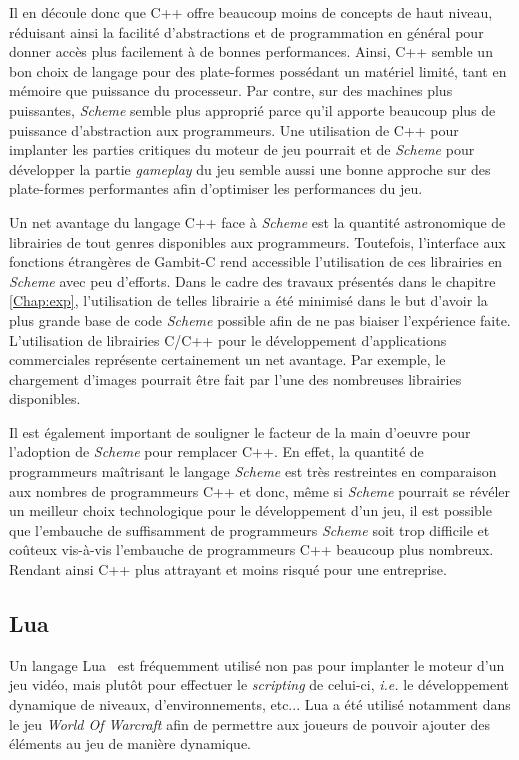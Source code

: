 \documentclass[12pt,twoside,letterpaper,francais]{book}
\newcommand{\ie}{{\textit{i.e. }}}
\newcommand{\Schemelang}{{\textit{Scheme }}}
\begin{document}
Il en découle donc que C++ offre beaucoup moins de concepts de haut
niveau, réduisant ainsi la facilité d'abstractions et de programmation
en général pour donner accès plus facilement à de bonnes
performances. Ainsi, C++ semble un bon choix de langage pour des
plate-formes possédant un matériel limité, tant en mémoire que
puissance du processeur. Par contre, sur des machines plus puissantes,
\Schemelang semble plus approprié parce qu'il apporte beaucoup plus de
puissance d'abstraction aux programmeurs. Une utilisation de C++ pour
implanter les parties critiques du moteur de jeu pourrait et de \Schemelang
pour développer la partie \textit{gameplay} du jeu semble aussi une
bonne approche sur des plate-formes performantes afin d'optimiser les
performances du jeu.

Un net avantage du langage C++ face à \Schemelang est la quantité
astronomique de librairies de tout genres disponibles aux
programmeurs. Toutefois, l'interface aux fonctions étrangères de
Gambit-C rend accessible l'utilisation de ces librairies en \Schemelang
avec peu d'efforts. Dans le cadre des travaux présentés dans le
chapitre \ref{Chap:exp}, l'utilisation de telles librairie a été
minimisé dans le but d'avoir la plus grande base de code \Schemelang
possible afin de ne pas biaiser l'expérience faite. L'utilisation de
librairies C/C++ pour le développement d'applications commerciales
représente certainement un net avantage. Par exemple, le chargement
d'images pourrait être fait par l'une des nombreuses librairies
disponibles.

Il est également important de souligner le facteur de la main d'oeuvre
pour l'adoption de \Schemelang pour remplacer C++. En effet, la quantité de
programmeurs maîtrisant le langage \Schemelang est très restreintes en
comparaison aux nombres de programmeurs C++ et donc, même si \Schemelang
pourrait se révéler un meilleur choix technologique pour le
développement d'un jeu, il est possible que l'embauche de suffisamment
de programmeurs \Schemelang soit trop difficile et coûteux vis-à-vis
l'embauche de programmeurs C++ beaucoup plus nombreux. Rendant ainsi
C++ plus attrayant et moins risqué pour une entreprise.


\FloatBarrier
\subsection{Lua}
Un langage Lua~\cite{Lua} est fréquemment utilisé non pas pour
implanter le moteur d'un jeu vidéo, mais plutôt pour effectuer le
\textit{scripting} de celui-ci, \ie le développement dynamique de
niveaux, d'environnements, etc... Lua a été utilisé notamment dans le
jeu \textit{World Of Warcraft} afin de permettre aux joueurs de
pouvoir ajouter des éléments au jeu de manière dynamique.
\end{document}
